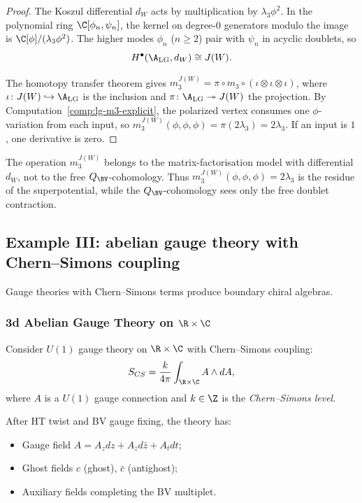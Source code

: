 \begin{proof}
The Koszul differential \(d_W\) acts by multiplication by
\(\lambda_3\phi^2\). In the polynomial ring \(\C[\phi_n,\psi_n]\),
the kernel on degree-$0$ generators modulo the image is
\(\C[\phi]/(\lambda_3\phi^2)\). The higher modes \(\phi_n\)
(\(n\geq2\)) pair with \(\psi_n\) in acyclic doublets, so
\[
H^\bullet(\A_{\mathrm{LG}},d_W)\cong J(W).
\]

The homotopy transfer theorem gives
\(m_3^{J(W)} = \pi \circ m_3 \circ
(\iota \otimes \iota \otimes \iota)\), where
\(\iota\colon J(W) \hookrightarrow \A_{\mathrm{LG}}\) is the inclusion
and \(\pi\colon \A_{\mathrm{LG}} \twoheadrightarrow J(W)\) the
projection. By Computation~\ref{comp:lg-m3-explicit}, the polarized
vertex consumes one \(\phi\)-variation from each input, so
\(m_3^{J(W)}(\phi,\phi,\phi)=\pi(2\lambda_3)=2\lambda_3\). If an input
is \(1\), one derivative is zero.
\end{proof}

\begin{remark}
The operation \(m_3^{J(W)}\) belongs to the matrix-factorisation
model with differential \(d_W\), not to the free \(Q_{\BV}\)-cohomology.
Thus \(m_3^{J(W)}(\phi,\phi,\phi)=2\lambda_3\) is the residue of the
superpotential, while the \(Q_{\BV}\)-cohomology sees only the free
doublet contraction.
\end{remark}

\subsection{Example III: abelian gauge theory with Chern--Simons coupling}
\label{rem:abelian_CS}

Gauge theories with Chern--Simons terms produce boundary chiral algebras.

\subsubsection{3d Abelian Gauge Theory on $\R \times \C$}

Consider $U(1)$ gauge theory on $\R \times \C$ with Chern--Simons coupling:
\[
S_{CS} = \frac{k}{4\pi} \int_{\R \times \C} A \wedge dA,
\]
where $A$ is a $U(1)$ gauge connection and $k \in \Z$ is the \emph{Chern--Simons level}.

After HT twist and BV gauge fixing, the theory has:
\begin{itemize}
\item Gauge field $A = A_z dz + A_{\bar{z}} d\bar{z} + A_t dt$;
\item Ghost fields $c$ (ghost), $\bar{c}$ (antighost);
\item Auxiliary fields completing the BV multiplet.
\end{itemize}

